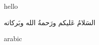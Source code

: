 \documentclass[a4paper,10pt]{article}
\begin{document}
hello
\begin{arabtext}
السَلامُ عَليكم ورَحمةُ الله وبَركاته  
\end{arabtext}
arabic
\end{document}
